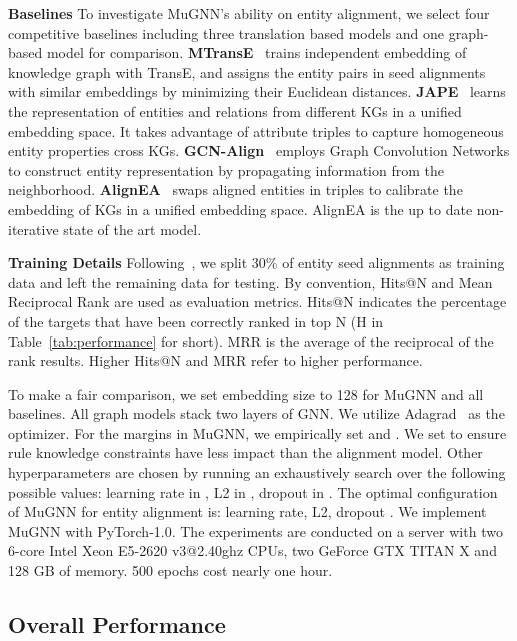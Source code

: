 \documentclass[11pt,a4paper]{article}
\newcommand{\vpara}[1]{\vspace{0.1in}\noindent\textbf{#1 }}
\begin{document}
\vpara{Baselines}
To investigate MuGNN's ability on entity alignment, we select four competitive baselines including three translation based models and one graph-based model for comparison. \textbf{MTransE}~\cite{chen2016multilingual} trains independent embedding of knowledge graph with TransE, and assigns the entity pairs in seed alignments with similar embeddings by minimizing their Euclidean distances. \textbf{JAPE}~\cite{sun2017cross} learns the representation of entities and relations from different KGs in a unified embedding space. It takes advantage of attribute triples to capture homogeneous entity properties cross KGs. \textbf{GCN-Align}~\cite{wang2018cross} employs Graph Convolution Networks to construct entity representation by propagating information from the neighborhood.  \textbf{AlignEA}~\cite{sun2018bootstrapping} swaps aligned entities in triples to calibrate the embedding of KGs in a unified embedding space. AlignEA is the up to date non-iterative state of the art model.

\vpara{Training Details}
Following~\citet{sun2017cross, sun2018bootstrapping}, we split 30\% of entity seed alignments as training data and left the remaining data for testing. By convention, Hits@N and Mean Reciprocal Rank are used as evaluation metrics. Hits@N indicates the percentage of the targets that have been correctly ranked in top N (H in Table~\ref{tab:performance} for short). MRR is the average of the reciprocal of the rank results. Higher Hits@N and MRR refer to higher performance.

To make a fair comparison, we set embedding size to 128 for MuGNN and all baselines. All graph models stack two layers of GNN. We utilize Adagrad~\cite{duchi2011adaptive} as the optimizer. For the margins in MuGNN, we empirically set  and . We set  to ensure rule knowledge constraints have less impact than the alignment model. Other hyperparameters are chosen by running an exhaustively search over the following possible values: learning rate in , L2 in , dropout in . The optimal configuration of MuGNN for entity alignment is: learning rate, L2, dropout . We implement MuGNN with PyTorch-1.0. The experiments are conducted on a server with two 6-core Intel Xeon E5-2620 v3@2.40ghz CPUs, two GeForce GTX TITAN X and 128 GB of memory. 500 epochs cost nearly one hour.

\subsection{Overall Performance}
\end{document}
